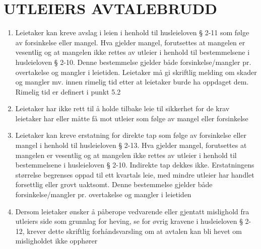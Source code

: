 \section{UTLEIERS AVTALEBRUDD}


    \begin{enumerate}


        \item Leietaker kan kreve avslag i leien i henhold til husleieloven § 2-11 som følge av forsinkelse eller
        mangel. Hva gjelder mangel, forutsettes at mangelen er vesentlig og at mangelen ikke rettes av utleier i henhold
        til bestemmelsene i husleieloven § 2-10. Denne bestemmelse gjelder både
        forsinkelse/mangler pr. overtakelse og mangler i leietiden. Leietaker må gi skriftlig melding om skader og mangler
        mv. innen rimelig tid etter at leietaker burde ha oppdaget dem. Rimelig tid er definert i punkt 5.2

        \item Leietaker har ikke rett til å holde tilbake leie til sikkerhet for de krav leietaker har eller måtte få mot utleier som følge av mangel eller forsinkelse

        \item Leietaker kan kreve erstatning for direkte tap som følge av forsinkelse eller mangel i henhold til
        husleieloven § 2-13. Hva gjelder mangel, forutsettes at mangelen er vesentlig og at mangelen ikke rettes av
        utleier i henhold til bestemmelsene i husleieloven § 2-10. Indirekte tap dekkes ikke.
        Erstatningens størrelse begrenses oppad til ett kvartals leie, med mindre utleier har handlet forsettlig
        eller grovt uaktsomt. Denne bestemmelse gjelder både forsinkelse/mangler pr. overtakelse og mangler i
        leietiden

        \item Dersom leietaker ønsker å påberope vedvarende eller gjentatt mislighold fra utleiers side som grunnlag
        for heving, se for øvrig kravene i husleieloven § 2-12, krever dette skriftlig forhåndsvarsling om at avtalen
        kan bli hevet om misligholdet ikke opphører


    \end{enumerate}
